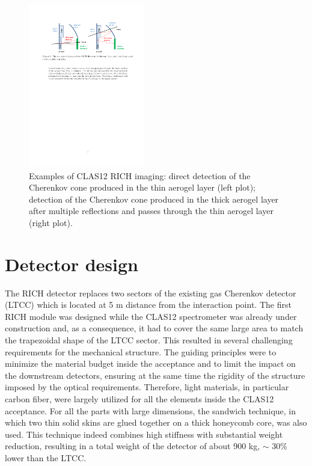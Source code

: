 \documentclass[5p,times,twocolumn]{elsarticle}
\begin{document}
\begin{figure}
\begin{center}
\includegraphics[width=0.45\textwidth]{Layout.pdf}
\caption{Examples of CLAS12 RICH imaging: direct detection of the Cherenkov cone produced in the thin aerogel layer (left plot); detection of the Cherenkov cone produced in the thick aerogel layer after multiple reflections and passes through the thin aerogel layer (right plot).}
\label{Fig:RICHsketch}
\end{center}
\end{figure}


\section{Detector design}

The RICH detector replaces two sectors of the existing gas Cherenkov detector (LTCC) which is located at 5 m distance from the interaction point. The first RICH module was designed while the CLAS12 spectrometer was already under construction and,  as a consequence, it had to cover the same large area to match the trapezoidal shape of the LTCC sector.
This resulted in several challenging requirements for the mechanical structure.
The guiding principles were to minimize the material budget inside the acceptance and to limit the impact on the downstream detectors, ensuring at the same time the rigidity of the structure imposed by the optical requirements.
Therefore, light materials, in particular carbon fiber, were largely utilized for all the elements inside the CLAS12 acceptance.
For all the parts with large dimensions, the sandwich technique, in which two thin solid skins are glued together on a thick honeycomb core, was also used.
This technique indeed combines high stiffness with substantial weight reduction, resulting in a total weight of the detector of about 900 kg, $\sim$ 30\% lower than the LTCC.
\end{document}
